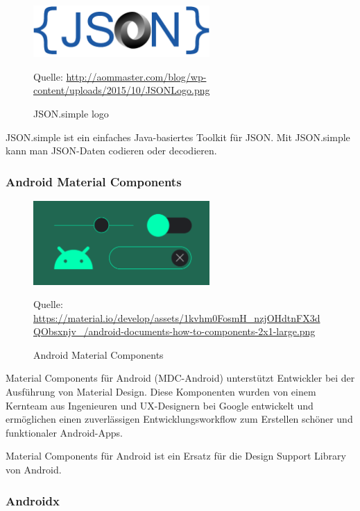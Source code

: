 \documentclass[10pt]{scrartcl}
\newcommand*{\quelle}{%
	\footnotesize Quelle:
}
\begin{document}
\begin{figure}[H]
	\centering
	\includegraphics[width=0.6\textwidth]{Bilder/BibliothekenLogos/JSONLogo.png}
	\caption{JSON.simple logo}
	\quelle\url{http://aommaster.com/blog/wp-content/uploads/2015/10/JSONLogo.png}
\end{figure}

JSON.simple ist ein einfaches Java-basiertes Toolkit für JSON. Mit JSON.simple kann man JSON-Daten codieren oder decodieren.

\subsubsection{Android Material Components}
	
\begin{figure}[H]
	\centering
	\includegraphics[width=0.6\textwidth]{Bilder/BibliothekenLogos/AndroidMaterialComponenLogo.png}
	\caption{Android Material Components}
	\quelle\url{https://material.io/develop/assets/1kvhm0FosmH_nzjOHdtnFX3dQObsxnjv_/android-documents-how-to-components-2x1-large.png}
\end{figure}


Material Components für Android (MDC-Android) unterstützt Entwickler bei der Ausführung von Material Design. Diese Komponenten wurden von einem Kernteam aus Ingenieuren und UX-Designern bei Google entwickelt und ermöglichen einen zuverlässigen Entwicklungsworkflow zum Erstellen schöner und funktionaler Android-Apps.

Material Components für Android ist ein Ersatz für die Design Support Library von Android.

\subsubsection{Androidx}
\end{document}
